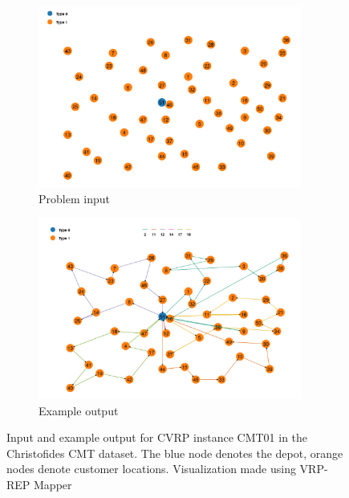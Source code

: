 \documentclass[12pt]{report}
\begin{document}
\begin{figure}[]
    \centering
    \begin{subfigure}[b]{0.49\linewidth}
        \centering
        \includegraphics[width=0.95\textwidth]{images/cmt01.png}
        \caption{Problem input}
    \end{subfigure}
    \begin{subfigure}[b]{0.49\linewidth}
        \centering
        \includegraphics[width=0.95\textwidth]{images/cmt01_solution.png}
        \caption{Example output}
    \end{subfigure}
    \caption{Input and example output for CVRP instance CMT01 in the Christofides CMT dataset. The blue node denotes the depot, orange nodes denote customer locations. Visualization made using VRP-REP Mapper \protect\footnotemark }
	\label{fig:prob_example}
\end{figure}

\end{document}

